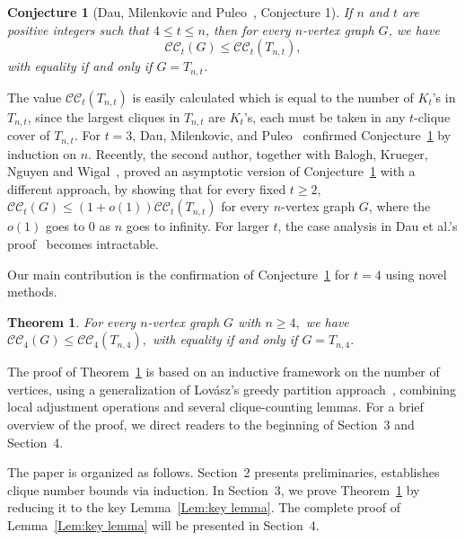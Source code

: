 \documentclass[11pt,a4paper]{article}
\newtheorem{thm}[dfn]{Theorem}
\newtheorem{conjecture}[dfn]{Conjecture}
\newcommand{\tcoveropt}[1]{\mathcal{C}\mathcal{C}_t(#1)}
\newcommand{\turangraph}[2]{T_{#1,#2}}
\newcommand{\coveropt}[2]{{\mathcal{C}\mathcal{C}_{#1}(#2)}}
\begin{document}
\begin{conjecture}[Dau, Milenkovic and Puleo~\cite{DMP}, Conjecture 1]\label{conj:clique_cover}
If $n$ and $t$ are positive integers such that $4\le t\le n$, 
then for every $n$-vertex graph $G$, we have
\[ \tcoveropt{G} \le \tcoveropt{\turangraph{n}{t}}, \]
with equality if and only if $G = \turangraph{n}{t}$. 
\end{conjecture}

The value $\tcoveropt{\turangraph{n}{t}}$ is easily calculated which is equal to the number of $K_t$'s in $\turangraph{n}{t}$, since the largest cliques in $\turangraph{n}{t}$ are $K_t$'s, each must be taken in any $t$-clique cover of $\turangraph{n}{t}$. 
For $t=3$, Dau, Milenkovic, and Puleo~\cite{DMP} confirmed Conjecture~\ref{conj:clique_cover} by induction on $n$.
Recently, the second author, together with Balogh, Krueger, Nguyen and Wigal~\cite{BHKNW}, proved an asymptotic version of Conjecture~\ref{conj:clique_cover} with a different approach, by showing that for every fixed $t \geq 2$, 
$\tcoveropt{G} \leq (1+o(1))\tcoveropt{\turangraph{n}{t}}$ 
for every $n$-vertex graph $G$, where the $o(1)$ goes to $0$ as $n$ goes to infinity.
For larger $t$, the case analysis in Dau et al.'s proof~\cite{DMP} becomes intractable. 

Our main contribution is the confirmation of Conjecture~\ref{conj:clique_cover} for $t=4$ using novel methods.

\begin{thm}	\label{Thm:Main}
    For every $n$-vertex graph $G$ with $n\ge 4,$ we have
	$\coveropt{4}{G} \leq \coveropt{4}{\turangraph{n}{4}},$
	with equality if and only if $G =\turangraph{n}{4}.$
\end{thm}

The proof of Theorem~\ref{Thm:Main} is based on an inductive framework on the number of vertices, 
using a generalization of Lov\'{a}sz's greedy partition approach~\cite{L68},
combining local adjustment operations and several clique-counting lemmas.
For a brief overview of the proof, we direct readers to the beginning of Section~3 and Section~4.

The paper is organized as follows.
Section~2 presents preliminaries, establishes clique number bounds via induction. 
In Section~3, we prove Theorem~\ref{Thm:Main} by reducing it to the key Lemma~\ref{Lem:key lemma}.
The complete proof of Lemma~\ref{Lem:key lemma} will be presented in Section~4.
\end{document}

